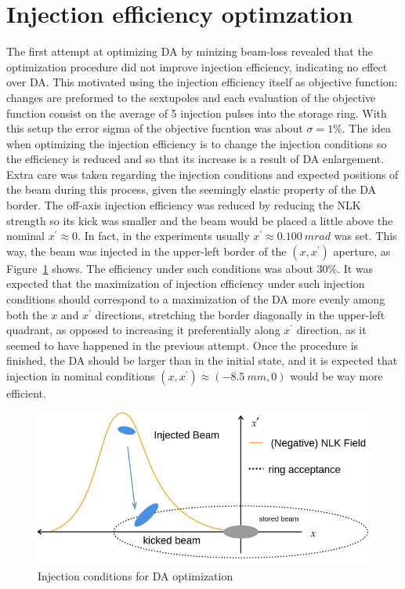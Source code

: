 \section{Injection efficiency optimzation}
The first attempt at optimizing DA by minizing beam-loss revealed that the optimization procedure did not improve injection efficiency, indicating no effect over DA. This motivated using the injection efficiency itself as objective function: changes are preformed to the sextupoles and each evaluation of the objective function consist on the average of 5 injection pulses into the storage ring. With this setup the error sigma of the objective fucntion was about $\sigma=1\%$.
The idea when optimizing the injection efficiency is to change the injection conditions so the efficiency is reduced and so that its increase is a result of DA enlargement. Extra care was taken regarding the injection conditions and expected positions of the beam during this process, given the seemingly elastic property of the DA border. The off-axis injection efficiency was reduced by reducing the NLK strength so its kick was smaller and the beam would be placed a little above the nominal $x^\prime\approx 0$. In fact, in the experiments usually $x^\prime\approx 0.100~\unit{mrad}$ was set. This way, the beam was injected in the upper-left border of the  $(x,x^\prime)$ aperture, as Figure~\ref{fig:inj_cond} shows. The efficiency under such conditions was about 30\%. It was expected that the maximization of injection efficiency under such injection conditions should correspond to a maximization of the DA more evenly among both the $x$ and $x^{\prime}$ directions, stretching the border diagonally in the upper-left quadrant, as opposed to increasing it preferentially along $x^\prime$ direction, as it seemed to have happened in the previous attempt. Once the procedure is finished, the DA should be larger than in the initial state, and it is expected that injection in nominal conditions $(x, x^\prime)\approx(-8.5~\unit{mm}, 0)$ would be way more efficient.
\begin{figure}
    \centering
    \includegraphics[width=\columnwidth]{Images/inj_cond.png}
    \caption{Injection conditions for DA optimization}
    \label{fig:inj_cond}
\end{figure}

